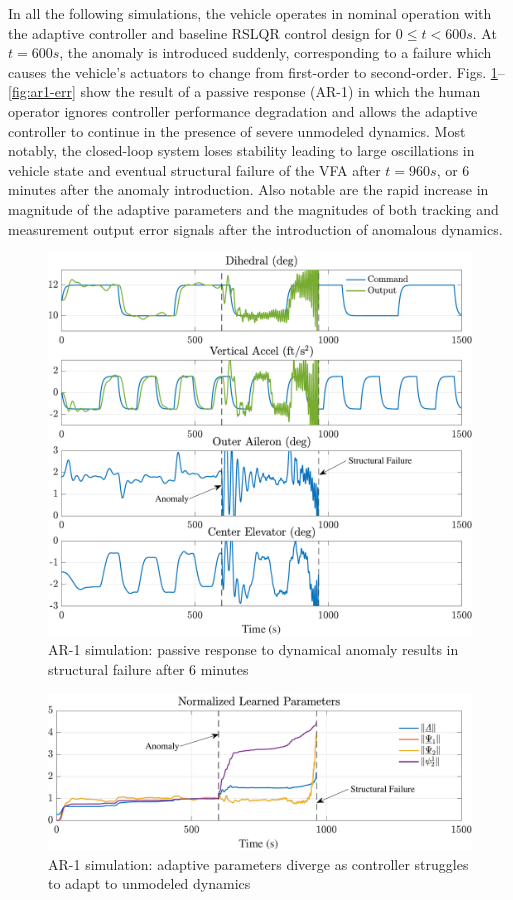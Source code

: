 \documentclass[english]{ifacconf}
\begin{document}
In all the following simulations, the vehicle operates in nominal operation with the adaptive controller and baseline RSLQR control design for $0 \leq t < 600 s$. At $t = 600 s$, the anomaly is introduced suddenly, corresponding to a failure which causes the vehicle's actuators to change from first-order to second-order. Figs. \ref{fig:ar1}--\ref{fig:ar1-err} show the result of a passive response (AR-1) in which the human operator ignores controller performance degradation and allows the adaptive controller to continue in the presence of severe unmodeled dynamics. Most notably, the closed-loop system loses stability leading to large oscillations in vehicle state and eventual structural failure of the VFA after $t = 960s$, or 6 minutes after the anomaly introduction. Also notable are the rapid increase in magnitude of the adaptive parameters and the magnitudes of both tracking and measurement output error signals after the introduction of anomalous dynamics.

\begin{figure}[htbp]
	\centering
	\includegraphics[width=\columnwidth]{../fig/ar1.pdf}
	\caption{AR-1 simulation: passive response to dynamical anomaly results in structural failure after 6 minutes}
	\label{fig:ar1}
\end{figure}

\begin{figure}[htbp]
	\centering
	\includegraphics[width=\columnwidth]{../fig/ar1-params.pdf}
	\caption{AR-1 simulation: adaptive parameters diverge as controller struggles to adapt to unmodeled dynamics}
	\label{fig:ar1-params}
\end{figure}
\end{document}
